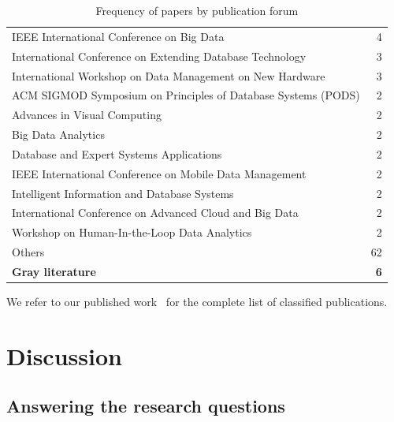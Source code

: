 \begin{table}[hptb]
\begin{tabularx}{\textwidth}{X r}
      \hspace{0.5em} IEEE International Conference on Big Data & 4 \\
      \hspace{0.5em} International Conference on Extending Database Technology & 3 \\
      \hspace{0.5em} International Workshop on Data Management on New Hardware & 3 \\
      \hspace{0.5em} ACM SIGMOD Symposium on Principles of Database Systems (PODS) & 2 \\
      \hspace{0.5em} Advances in Visual Computing & 2 \\
      \hspace{0.5em} Big Data Analytics & 2 \\
      \hspace{0.5em} Database and Expert Systems Applications & 2 \\
      \hspace{0.5em} IEEE International Conference on Mobile Data Management & 2 \\
      \hspace{0.5em} Intelligent Information and Database Systems & 2 \\
      \hspace{0.5em} International Conference on Advanced Cloud and Big Data & 2 \\
      \hspace{0.5em} Workshop on Human-In-the-Loop Data Analytics & 2 \\
      \hspace{0.5em} Others & 62 \\
    \textbf{Gray literature} & \textbf{6}
  \end{tabularx}
  \caption{Frequency of papers by publication forum}\label{tab:mapping/publication}
\end{table}

We refer to our published work~\cite{Alvarez2019} for the complete list of classified publications.

\section{Discussion}
\label{sec:mapping/discussion}

\subsection{Answering the research questions}


